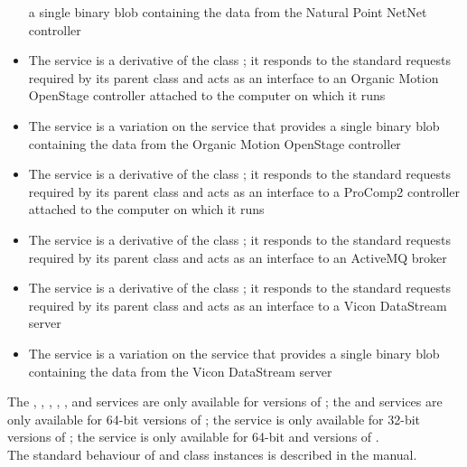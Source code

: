 \begin{itemize}
a single binary blob containing the data from the Natural Point NetNet controller
\item\exSp{}The \textbf{\OSI} service is a derivative of the \mplusm{} class
;
it responds to the standard requests required by its parent class and acts as an interface
to an Organic Motion OpenStage controller attached to the computer on which it runs
\item\exSp{}The \textbf{\OSBI} service is a variation on the \OSI{} service that provides
a single binary blob containing the data from the Organic Motion OpenStage controller
\item\exSp{}The \textbf{\PCtwoI} service is a derivative of the \mplusm{} class
;
it responds to the standard requests required by its parent class and acts as an interface
to a ProComp2 controller attached to the computer on which it runs
\item\exSp{}The \textbf{\SMO} service is a derivative of the \mplusm{} class
;
it responds to the standard requests required by its parent class and acts as an interface
to an ActiveMQ broker
\item\exSp{}The \textbf{\VDSI} service is a derivative of the \mplusm{} class
;
it responds to the standard requests required by its parent class and acts as an interface
to a Vicon DataStream server
\item\exSp{}The \textbf{\VBI} service is a variation on the \VDSI{} service that provides
a single binary blob containing the data from the Vicon DataStream server
\end{itemize}

The \KVtwoI, \KVtwoBI, \KVtwoSI, \NNI, \NNBI, \VDSI{} and \VBI{} services are only
available for \win{} versions of \mplusm;
the \OSI{} and \OSBI{} services are only available for \win{} 64-bit versions of \mplusm;
the \PCtwoI{} service is only available for \win{} 32-bit versions of \mplusm;
the \SMO{} service is only available for \win{} 64-bit and \osx{} versions of \mplusm.\\

The standard behaviour of  and 
class instances is described in the \emph{\MMM} manual.
\primaryEnd{}
